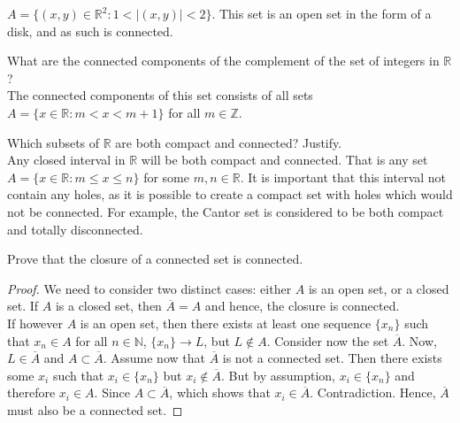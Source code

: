 \documentclass[12pt]{book}
\newcommand{\N}{\mathbb{N}}
\newcommand{\Z}{\mathbb{Z}}
\newcommand{\R}{\mathbb{R}}
\newenvironment{exercise}[2][Exercise]{\begin{trivlist}
\item[\hskip \labelsep {\bfseries #1}\hskip \labelsep {\bfseries #2.}]}{\end{trivlist}}
\begin{document}
\begin{exercise}{7.5.3}
$A= \{ (x,y) \in \R^2 : 1 < |(x,y)| < 2 \}$.
This set is an open set in the form of a disk, and as such is connected.
\end{exercise}



\begin{exercise}{7.5.5}
What are the connected components of the complement of the set of integers in $\R$? \\

The connected components of this set consists of all sets $A = \{ x \in \R : m < x < m+1 \}$ for all $m \in \Z$.
\end{exercise}



\begin{exercise}{7.5.7}
Which subsets of $\R$ are both compact and connected? Justify. \\

Any closed interval in $\R$ will be both compact and connected. That is any set $A= \{ x \in \R : m \leq x \leq n \}$ for some $m, n \in \R$. It is important that this interval not contain any holes, as it is possible to create a compact set with holes which would not be connected. For example,  the Cantor set is considered to be both compact and totally disconnected.
\end{exercise}


\begin{exercise}{7.5.10}
Prove that the closure of a connected set is connected.

\begin{proof}
We need to consider two distinct cases: either $A$ is an open set, or a closed set. If $A$ is a closed set, then $\overline{A} = A$ and hence, the closure is connected. \\
If however $A$ is an open set, then there exists at least one sequence $\{x_n\}$ such that $x_n \in A$ for all $n \in \N$, $\{x_n \} \to L$, but $L \notin A$. Consider now the set $\overline{A}$. Now, $L \in \overline{A}$ and $A \subset \overline{A}$. Assume now that $\overline{A}$ is not a connected set. Then there exists some $x_i$ such that $x_i \in \{x_n\}$ but $x_i \notin \overline{A}$. But by assumption, $x_i \in \{x_n\}$ and therefore $x_i \in A$. Since $A \subset \overline{A}$, which shows that $x_i \in \overline{A}$. Contradiction. Hence, $\overline{A}$ must also be a connected set.
\end{proof}
\end{exercise}
\end{document}
